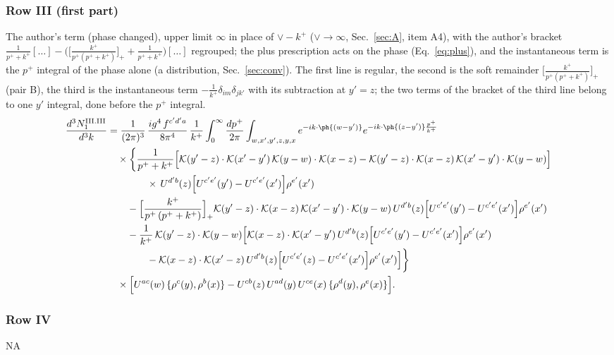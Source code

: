 \subsubsection*{Row III (first part)}
The author's term (phase changed), upper limit $\infty$ in place of $\vee-k^{+}$ ($\vee\to\infty$, Sec.~\ref{sec:A}, item A4), with the author's bracket $\frac{1}{p^{+}+k^{+}}[\dots]-\big(\big[\frac{k^{+}}{p^{+}(p^{+}+k^{+})}\big]_{+}+\frac{1}{p^{+}+k^{+}}\big)[\dots]$ regrouped; the plus prescription acts on the phase (Eq.~\eqref{eq:plus}), and the instantaneous term is the $p^{+}$ integral of the phase alone (a distribution, Sec.~\ref{sec:conv}). The first line is regular, the second is the soft remainder $\big[\frac{k^{+}}{p^{+}(p^{+}+k^{+})}\big]_{+}$ (pair B), the third is the instantaneous term $-\frac{1}{k^{+}}\delta_{im}\delta_{jk'}$ with its subtraction at $y'=z$; the two terms of the bracket of the third line belong to one $y'$ integral, done before the $p^{+}$ integral.
\begin{align}
\frac{d^{3}N^{\rm III.III}_{1}}{d^{3}k} & =\frac{1}{(2\pi)^{3}}\,\frac{ig^{4}\,f^{c'd'a}}{8\pi^{4}}\,\frac{1}{k^{+}}\int_{0}^{\infty}\frac{dp^{+}}{2\pi}\int_{w,x',y',z,y,x}e^{-ik\cdot\ph{(w-y')}}e^{-ik\cdot\ph{(z-y')}\frac{p^{+}}{k^{+}}}\notag\\
&\quad\times\bigg\{\frac{1}{p^{+}+k^{+}}\Big[\mathcal{K}(y'-z)\cdot\mathcal{K}(x'-y')\,\mathcal{K}(y-w)\cdot\mathcal{K}(x-z)-\mathcal{K}(y'-z)\cdot\mathcal{K}(x-z)\,\mathcal{K}(x'-y')\cdot\mathcal{K}(y-w)\Big]\notag\\
&\qquad\qquad\times\,U^{d'b}(z)\Big[U^{c'e'}(y')-U^{c'e'}(x')\Big]\rho^{e'}(x')\notag\\
&\qquad-\Big[\frac{k^{+}}{p^{+}\,(p^{+}+k^{+})}\Big]_{+}\mathcal{K}(y'-z)\cdot\mathcal{K}(x-z)\,\mathcal{K}(x'-y')\cdot\mathcal{K}(y-w)\,U^{d'b}(z)\Big[U^{c'e'}(y')-U^{c'e'}(x')\Big]\rho^{e'}(x')\notag\\
&\qquad-\frac{1}{k^{+}}\,\mathcal{K}(y'-z)\cdot\mathcal{K}(y-w)\Big[\mathcal{K}(x-z)\cdot\mathcal{K}(x'-y')\,U^{d'b}(z)\Big[U^{c'e'}(y')-U^{c'e'}(x')\Big]\rho^{e'}(x')\notag\\
&\qquad\qquad-\mathcal{K}(x-z)\cdot\mathcal{K}(x'-z)\,U^{d'b}(z)\Big[U^{c'e'}(z)-U^{c'e'}(x')\Big]\rho^{e'}(x')\Big]\bigg\}\notag\\
&\quad\times \Big[U^{ac}(w)\,\{\rho^{c}(y),\rho^{b}(x)\}-U^{cb}(z)\,U^{ad}(y)\,U^{ce}(x)\,\{\rho^{d}(y),\rho^{e}(x)\}\Big].\label{eq:B-III3one}
\end{align}
\subsubsection*{Row IV} \textsc{NA}
